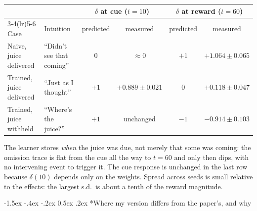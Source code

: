 \documentclass[10pt]{article}
\makeatletter
\renewcommand\section{\@startsection{section}{1}{\z@}%
  {-1.5ex \@plus -.4ex \@minus -.2ex}%
  {0.5ex \@plus .2ex}%
  {\normalfont\bfseries}}
\makeatother
\begin{document}
\begin{center}
\footnotesize
\begin{tabular}{@{}llcccc@{}}
\toprule
& & \multicolumn{2}{c}{$\delta$ at cue ($t=10$)} & \multicolumn{2}{c}{$\delta$ at reward ($t=60$)}\\
\cmidrule(lr){3-4}\cmidrule(lr){5-6}
Case & Intuition & predicted & measured & predicted & measured\\
\midrule
Naive, juice delivered   & ``Didn't see that coming'' & $0$  & $\approx 0$        & $+1$ & $+1.064 \pm 0.065$\\
Trained, juice delivered & ``Just as I thought''      & $+1$ & $+0.889 \pm 0.021$ & $0$  & $+0.118 \pm 0.047$\\
Trained, juice withheld  & ``Where's the juice?''     & $+1$ & unchanged          & $-1$ & $-0.914 \pm 0.103$\\
\bottomrule
\end{tabular}
\end{center}

\noindent
The learner stores \emph{when} the juice was due, not merely that some was coming: the omission trace
is flat from the cue all the way to $t=60$ and only then dips, with no intervening event to trigger
it. The cue response is unchanged in the last row because $\delta(10)$ depends only on the weights.
Spread across seeds is small relative to the effects: the largest s.d.\ is about a tenth of the
reward magnitude.

\section*{Where my version differs from the paper's, and why}
\end{document}
